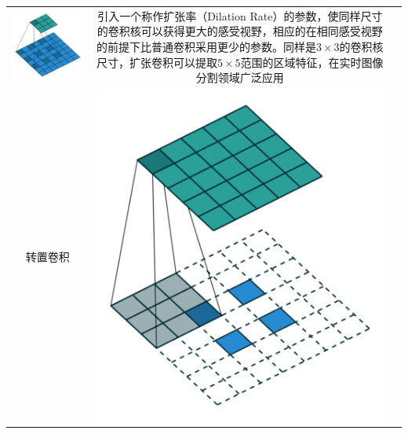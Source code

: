 \begin{longtable}[]{@{}ccl@{}}
\begin{minipage}[t]{0.22\columnwidth}
\includegraphics{./img/ch5/img8.png}\strut
\end{minipage} & \begin{minipage}[t]{0.46\columnwidth}\raggedright\strut
引入一个称作扩张率（Dilation
Rate）的参数，使同样尺寸的卷积核可以获得更大的感受视野，相应的在相同感受视野的前提下比普通卷积采用更少的参数。同样是\(3\times3\)的卷积核尺寸，扩张卷积可以提取\(5\times5\)范围的区域特征，在实时图像分割领域广泛应用\strut
\end{minipage}\tabularnewline
\begin{minipage}[t]{0.23\columnwidth}\centering\strut
转置卷积\strut
\end{minipage} & \begin{minipage}[t]{0.22\columnwidth}\centering\strut
\includegraphics{./img/ch5/img10.png}\strut

\end{minipage}
\end{longtable}
